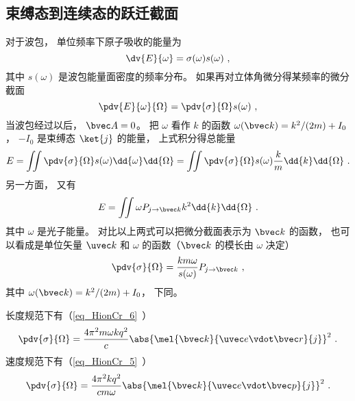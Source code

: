 \subsection{束缚态到连续态的跃迁截面}
对于波包， 单位频率下原子吸收的能量为
\begin{equation}
\dv{E}{\omega} = \sigma(\omega) s(\omega)~,
\end{equation}
其中 $s(\omega)$ 是波包能量面密度的频率分布。 如果再对立体角微分得某频率的微分截面 %
\begin{equation}
\pdv{E}{\omega}{\Omega} = \pdv{\sigma}{\Omega} s(\omega)~,
\end{equation}
当波包经过以后， $\bvec A = 0$。 把 $\omega$ 看作 $k$ 的函数 $\omega(\bvec k) = k^2/(2m) + I_0$， $-I_0$ 是束缚态 $\ket{j}$ 的能量， 上式积分得总能量
\begin{equation}
E = \iint \pdv{\sigma}{\Omega} s(\omega) \dd{\omega}\dd{\Omega} = \iint \pdv{\sigma}{\Omega} s(\omega) \frac{k}{m}\dd{k}\dd{\Omega}~.
\end{equation}
另一方面， 又有
\begin{equation}
E = \iint \omega P_{j\to {\bvec k}} k^2 \dd{k}\dd{\Omega}~.
\end{equation}
其中 $\omega$ 是光子能量。 对比以上两式可以把微分截面表示为 $\bvec k$ 的函数， 也可以看成是单位矢量 $\uvec k$ 和 $\omega$ 的函数（$\bvec k$ 的模长由 $\omega$ 决定）
\begin{equation}
\pdv{\sigma}{\Omega} = \frac{km \omega}{s(\omega)} P_{j\to \bvec k}~,
\end{equation}
其中 $\omega(\bvec k) = k^2/(2m) + I_0$， 下同。

长度规范下有（\autoref{eq_HionCr_6}~）
\begin{equation}
\pdv{\sigma}{\Omega} = \frac{4\pi^2 m\omega k q^2}{c} \abs{\mel{\bvec k}{\uvec e \vdot\bvec r}{j}}^2~.
\end{equation}
速度规范下有（\autoref{eq_HionCr_5}~）
\begin{equation}\label{eq_SIcros_8} %
\pdv{\sigma}{\Omega} = \frac{4\pi^2 k q^2}{c m \omega} \abs{\mel{\bvec k}{\uvec e \vdot \bvec p}{j}}^2~.
\end{equation}
